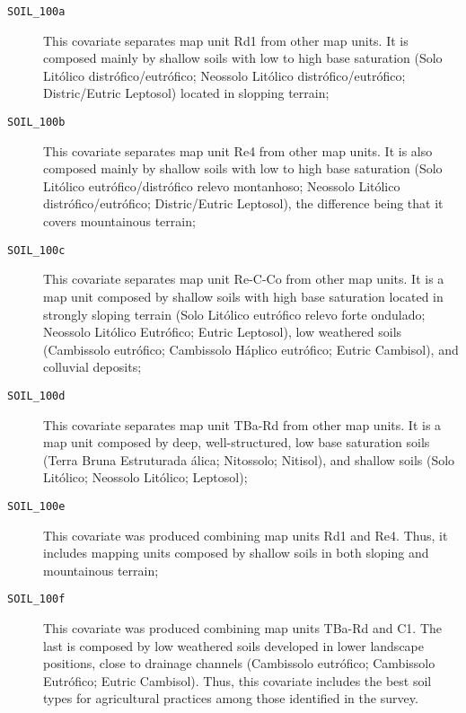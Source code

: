 \begin{description}
  \item[\texttt{SOIL\_100a}] This covariate separates map unit Rd1 from other map units. It is composed mainly by shallow soils with low to high base saturation (Solo Litólico distrófico/eutrófico; Neossolo Litólico distrófico/eutrófico; Distric/Eutric Leptosol) located in slopping terrain;
  
  \item[\texttt{SOIL\_100b}] This covariate separates map unit Re4 from other map units. It is also composed mainly by shallow soils with low to high base saturation (Solo Litólico eutrófico/distrófico relevo montanhoso; Neossolo Litólico distrófico/eutrófico; Distric/Eutric Leptosol), the difference being that it covers mountainous terrain;
  
  \item[\texttt{SOIL\_100c}] This covariate separates map unit Re-C-Co from other map units. It is a map unit composed by shallow soils with high base saturation located in strongly sloping terrain (Solo Litólico eutrófico relevo forte ondulado; Neossolo Litólico Eutrófico; Eutric Leptosol), low weathered soils (Cambissolo eutrófico; Cambissolo Háplico eutrófico; Eutric Cambisol), and colluvial deposits;
  
  \item[\texttt{SOIL\_100d}] This covariate separates map unit TBa-Rd from other map units. It is a map unit composed by deep, well-structured, low base saturation soils (Terra Bruna Estruturada álica; Nitossolo; Nitisol), and shallow soils (Solo Litólico; Neossolo Litólico; Leptosol);
  
  \item[\texttt{SOIL\_100e}] This covariate was produced combining map units Rd1 and Re4. Thus, it includes mapping units composed by shallow soils in both sloping and mountainous terrain;
  
  \item[\texttt{SOIL\_100f}] This covariate was produced combining map units TBa-Rd and C1. The last is composed by low weathered soils developed in lower landscape positions, close to drainage channels (Cambissolo eutrófico; Cambissolo Eutrófico; Eutric Cambisol). Thus, this covariate includes the best soil types for agricultural practices among those identified in the survey.
\end{description}


